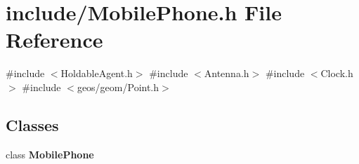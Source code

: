 \section{include/\+Mobile\+Phone.h File Reference}
\label{_mobile_phone_8h}
{\ttfamily \#include $<$Holdable\+Agent.\+h$>$}\newline
{\ttfamily \#include $<$Antenna.\+h$>$}\newline
{\ttfamily \#include $<$Clock.\+h$>$}\newline
{\ttfamily \#include $<$geos/geom/\+Point.\+h$>$}\newline
\subsection*{Classes}
\begin{DoxyCompactItemize}
\item 
class \textbf{ Mobile\+Phone}
\end{DoxyCompactItemize}

